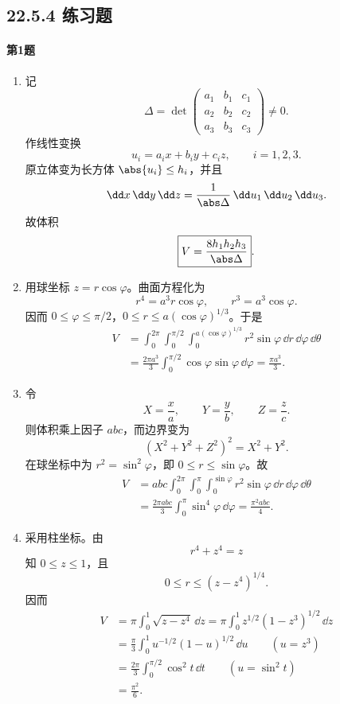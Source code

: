 \subsection*{22.5.4 练习题}

\paragraph{第1题}
\begin{xsolution}
\begin{enumerate}[label=(\arabic*)]
  \item 记
  \[
   \Delta=\det
   \begin{pmatrix}
    a_1&b_1&c_1\\
    a_2&b_2&c_2\\
    a_3&b_3&c_3
   \end{pmatrix}\ne0.
  \]
  作线性变换
  \[
   u_i=a_ix+b_iy+c_iz,
   \qquad i=1,2,3.
  \]
  原立体变为长方体 $\abs{u_i}\le h_i$，并且
  \[
   \dd x\,\dd y\,\dd z=\frac1{\abs\Delta}\,\dd u_1\,\dd u_2\,\dd u_3.
  \]
  故体积
  \[
   \boxed{V=\frac{8h_1h_2h_3}{\abs\Delta}}.
  \]

  \item 用球坐标 $z=r\cos\varphi$。曲面方程化为
  \[
   r^4=a^3r\cos\varphi,
   \qquad r^3=a^3\cos\varphi.
  \]
  因而 $0\le\varphi\le\pi/2$，$0\le r\le a(\cos\varphi)^{1/3}$。于是
  \begin{align*}
   V&=\int_0^{2\pi}\int_0^{\pi/2}\int_0^{a(\cos\varphi)^{1/3}}
   r^2\sin\varphi\,\dd r\,\dd\varphi\,\dd\theta\\
   &=\frac{2\pi a^3}{3}\int_0^{\pi/2}\cos\varphi\sin\varphi\,\dd\varphi
   =\boxed{\frac{\pi a^3}{3}}.
  \end{align*}

  \item 令
  \[
   X=\frac xa,
   \qquad Y=\frac yb,
   \qquad Z=\frac zc.
  \]
  则体积乘上因子 $abc$，而边界变为
  \[
   (X^2+Y^2+Z^2)^2=X^2+Y^2.
  \]
  在球坐标中为 $r^2=\sin^2\varphi$，即 $0\le r\le\sin\varphi$。故
  \begin{align*}
   V&=abc\int_0^{2\pi}\int_0^\pi\int_0^{\sin\varphi}
   r^2\sin\varphi\,\dd r\,\dd\varphi\,\dd\theta\\
   &=\frac{2\pi abc}{3}\int_0^\pi\sin^4\varphi\,\dd\varphi
   =\boxed{\frac{\pi^2abc}{4}}.
  \end{align*}

  \item 采用柱坐标。由
  \[
   r^4+z^4=z
  \]
  知 $0\le z\le1$，且
  \[
   0\le r\le(z-z^4)^{1/4}.
  \]
  因而
  \begin{align*}
   V&=\pi\int_0^1\sqrt{z-z^4}\,\dd z
   =\pi\int_0^1z^{1/2}(1-z^3)^{1/2}\,\dd z\\
   &=\frac\pi3\int_0^1u^{-1/2}(1-u)^{1/2}\,\dd u
   \qquad(u=z^3)\\
   &=\frac{2\pi}{3}\int_0^{\pi/2}\cos^2 t\,\dd t
   \qquad(u=\sin^2t)\\
   &=\boxed{\frac{\pi^2}{6}}.
  \end{align*}
\end{enumerate}
\end{xsolution}

